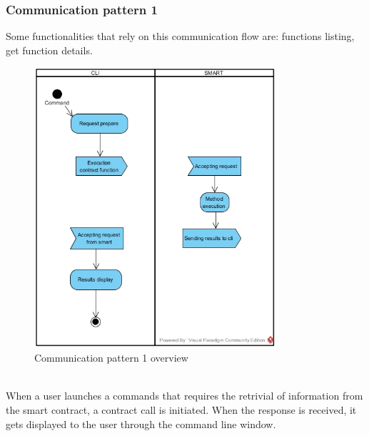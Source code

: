 \subsubsection{Communication pattern 1}
Some functionalities that rely on this communication flow are: functions listing, get function details.
\begin{figure}[h]
	\centering
	\includegraphics[width=0.8\textwidth]{res/img/pattern2.jpg}
	\caption{Communication pattern 1 overview}
\end{figure}\\
\noindent When a user launches a commands that requires the retrivial of information from the smart contract, a contract call is initiated. When the response is received, it gets displayed to the user through the command line window.\newline 
\newpage
